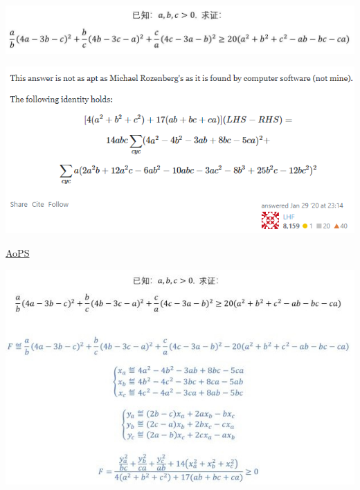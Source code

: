 \documentclass[UTF8]{ctexart}
\begin{document}
\subsection{}
\begin{center}
	\includegraphics[width=0.8\linewidth]{a25}
\end{center}
\begin{center}
	\includegraphics[width=0.8\linewidth]{a26}
\end{center}
\href{https://math.stackexchange.com/questions/3527494/}{AoPS}
\begin{center}
	\includegraphics[width=0.7\linewidth]{a27}
\end{center}
\end{document}
